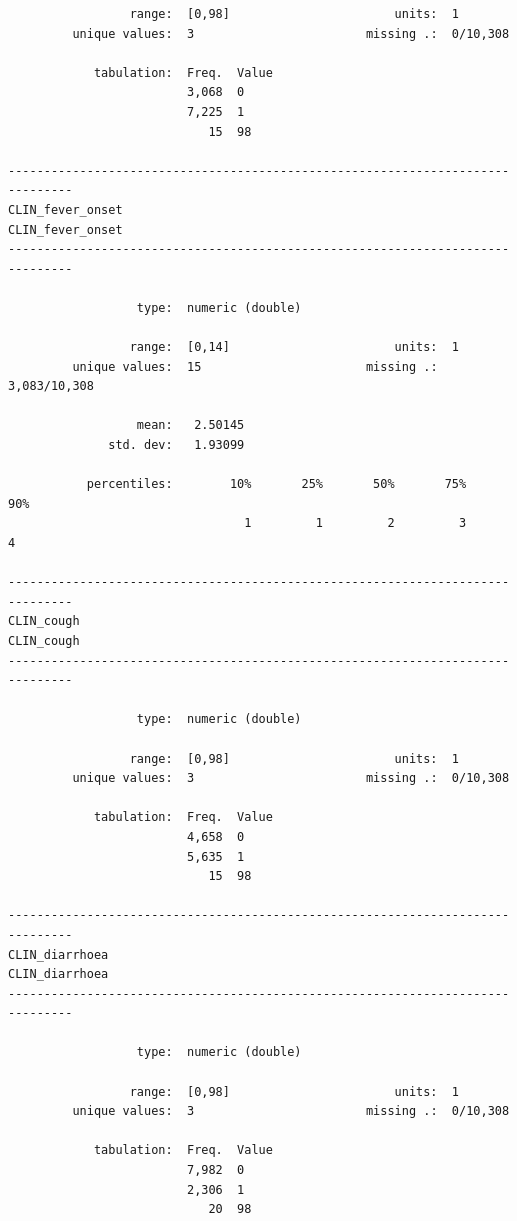 \documentclass[
  letterpaper,
  DIV=11,
  numbers=noendperiod]{scrreprt}
\begin{document}
\begin{verbatim}
                 range:  [0,98]                       units:  1
         unique values:  3                        missing .:  0/10,308

            tabulation:  Freq.  Value
                         3,068  0
                         7,225  1
                            15  98

-------------------------------------------------------------------------------
CLIN_fever_onset                                               CLIN_fever_onset
-------------------------------------------------------------------------------

                  type:  numeric (double)

                 range:  [0,14]                       units:  1
         unique values:  15                       missing .:  3,083/10,308

                  mean:   2.50145
              std. dev:   1.93099

           percentiles:        10%       25%       50%       75%       90%
                                 1         1         2         3         4

-------------------------------------------------------------------------------
CLIN_cough                                                           CLIN_cough
-------------------------------------------------------------------------------

                  type:  numeric (double)

                 range:  [0,98]                       units:  1
         unique values:  3                        missing .:  0/10,308

            tabulation:  Freq.  Value
                         4,658  0
                         5,635  1
                            15  98

-------------------------------------------------------------------------------
CLIN_diarrhoea                                                   CLIN_diarrhoea
-------------------------------------------------------------------------------

                  type:  numeric (double)

                 range:  [0,98]                       units:  1
         unique values:  3                        missing .:  0/10,308

            tabulation:  Freq.  Value
                         7,982  0
                         2,306  1
                            20  98


\end{verbatim}
\end{document}
